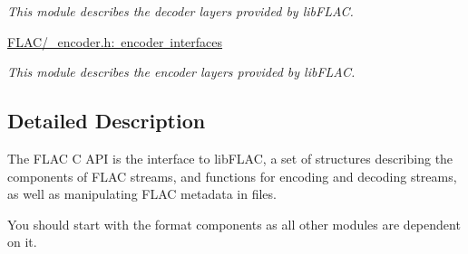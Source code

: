 \begin{DoxyCompactItemize}
\begin{DoxyCompactList}\small\item\em This module describes the decoder layers provided by lib\+F\+L\+AC. \end{DoxyCompactList}\item 
\mbox{\hyperlink{group__flac__encoder}{F\+L\+A\+C/\+\_\+encoder.\+h\+: encoder interfaces}}
\begin{DoxyCompactList}\small\item\em This module describes the encoder layers provided by lib\+F\+L\+AC. \end{DoxyCompactList}\end{DoxyCompactItemize}


\subsection{Detailed Description}
The F\+L\+AC C A\+PI is the interface to lib\+F\+L\+AC, a set of structures describing the components of F\+L\+AC streams, and functions for encoding and decoding streams, as well as manipulating F\+L\+AC metadata in files.

You should start with the format components as all other modules are dependent on it. 